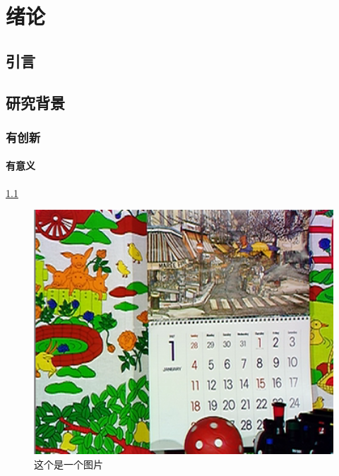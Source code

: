 \chapter{绪论}\label{ch:绪论}


\section{引言}\label{sec:引言}
\blindtext

\section{研究背景}
\blindtext

\blindtext\cite{yao2018mvsnet}\blindtext

\subsection{有创新}
\blindtext
\subsubsection{有意义}
\blindtext\ref{fig:heihei_img}

\begin{figure}[htb]
    \centering
    \includegraphics[width=1.0\textwidth]{figures/img.png}
    \caption{这个是一个图片}
    \label{fig:heihei_img}
\end{figure}
\endinput
